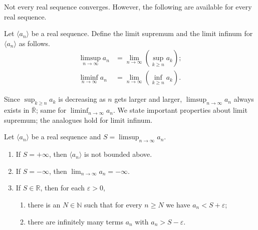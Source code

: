 Not every real sequence converges.  However, the following are available for every real sequence.

\begin{defn}
  Let $\langle a_n \rangle$ be a real sequence.  Define the \textsf{limit supremum} and the \textsf{limit infinum} for $\langle a_n \rangle$ as follows.
  \begin{align*}
    \limsup_{n\to\infty} a_n &= \lim_{n\to\infty} \left( \sup_{k\geqslant n} a_k \right); \\
    \liminf_{n\to\infty} a_n &= \lim_{n\to\infty} \left( \inf_{k\geqslant n} a_k \right).
  \end{align*}
\end{defn}

Since $\displaystyle \sup_{k \geqslant n} a_k$ is decreasing as $n$ gets larger and larger, $\displaystyle\limsup_{n\to\infty} a_n$ always exists in $\overline{\mathbb{R}}$; same for $\displaystyle\liminf_{n\to\infty} a_n$.
We state important properties about limit supremum; the analogues hold for limit infinum.

\begin{thm}
  \label{thm:limsup}
  Let $\langle a_n \rangle$ be a real sequence and $\displaystyle S = \limsup_{n\to\infty} a_n$.
  \begin{enumerate}[$(1)$]
    \item If $S = +\infty$, then $\langle a_n \rangle$ is not bounded above.
    \item If $S = -\infty$, then $\displaystyle \lim_{n\to\infty} a_n = -\infty$.
    \item If $S \in \mathbb{R}$, then for each $\varepsilon > 0$,
      \begin{enumerate}[$(i)$]
	\item there is an $N \in \mathbb{N}$ such that for every $n \geqslant N$ we have $a_n < S + \varepsilon$; 
	\item there are infinitely many terms $a_n$ with $a_n > S - \varepsilon$.
      \end{enumerate}
  \end{enumerate}
\end{thm}

